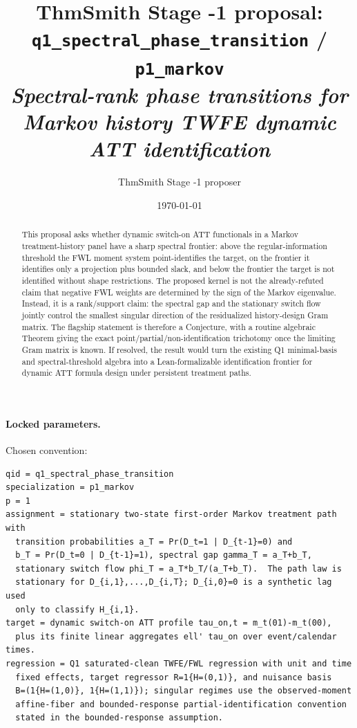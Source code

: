 \documentclass[11pt]{article}
\title{ThmSmith Stage -1 proposal: \texttt{q1\_spectral\_phase\_transition} / \texttt{p1\_markov}%
  \\ \large\textit{Spectral-rank phase transitions for Markov history TWFE dynamic ATT identification}}
\author{ThmSmith Stage -1 proposer}
\date{\today}
\theoremstyle{definition}
\theoremstyle{plain}
\theoremstyle{remark}
\begin{document}
\maketitle


\paragraph{Locked parameters.}
Chosen convention:
\begin{verbatim}
qid = q1_spectral_phase_transition
specialization = p1_markov
p = 1
assignment = stationary two-state first-order Markov treatment path with
  transition probabilities a_T = Pr(D_t=1 | D_{t-1}=0) and
  b_T = Pr(D_t=0 | D_{t-1}=1), spectral gap gamma_T = a_T+b_T,
  stationary switch flow phi_T = a_T*b_T/(a_T+b_T).  The path law is
  stationary for D_{i,1},...,D_{i,T}; D_{i,0}=0 is a synthetic lag used
  only to classify H_{i,1}.
target = dynamic switch-on ATT profile tau_on,t = m_t(01)-m_t(00),
  plus its finite linear aggregates ell' tau_on over event/calendar times.
regression = Q1 saturated-clean TWFE/FWL regression with unit and time
  fixed effects, target regressor R=1{H=(0,1)}, and nuisance basis
  B=(1{H=(1,0)}, 1{H=(1,1)}); singular regimes use the observed-moment
  affine-fiber and bounded-response partial-identification convention
  stated in the bounded-response assumption.
\end{verbatim}

\begin{abstract}
This proposal asks whether dynamic switch-on ATT functionals in a Markov treatment-history panel have a sharp spectral frontier: above the regular-information threshold the FWL moment system point-identifies the target, on the frontier it identifies only a projection plus bounded slack, and below the frontier the target is not identified without shape restrictions.
The proposed kernel is not the already-refuted claim that negative FWL weights are determined by the sign of the Markov eigenvalue.
Instead, it is a rank/support claim: the spectral gap and the stationary switch flow jointly control the smallest singular direction of the residualized history-design Gram matrix.
The flagship statement is therefore a Conjecture, with a routine algebraic Theorem giving the exact point/partial/non-identification trichotomy once the limiting Gram matrix is known.
If resolved, the result would turn the existing Q1 minimal-basis and spectral-threshold algebra into a Lean-formalizable identification frontier for dynamic ATT formula design under persistent treatment paths.
\end{abstract}
\end{document}
